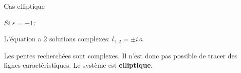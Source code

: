 \documentclass[
mode=present,    %
paper=a4paper,   %
orient=landscape,
display=slides,   %
size=10pt,
style=romain   %
]{powerdot}
\begin{document}
\begin{slide}[toc=Cas elliptique]{Cas elliptique}

\emph{Si $\varepsilon=-1$:}

\bigskip

L'équation a 2 solutions complexes: $\boxed{ l_{1,2}=\pm i\,a }$

\bigskip

Les pentes recherchées sont complexes. Il n'est donc pas possible de tracer des lignes caractéristiques. Le système est \textbf{elliptique}.



\end{slide}
\end{document}
